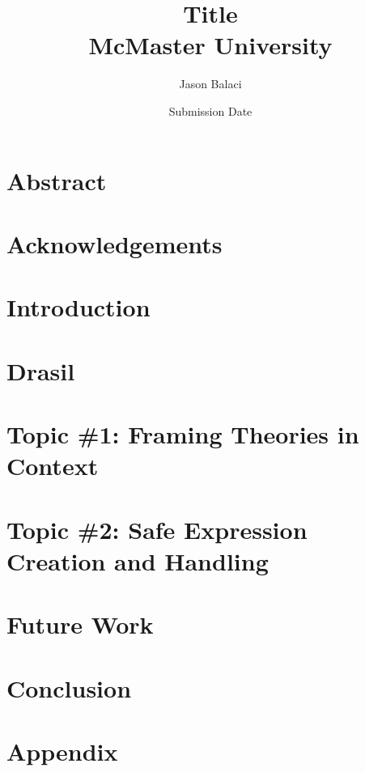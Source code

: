 \documentclass[12pt]{report}
\title{
    {Title}\\
    {McMaster University}
}
\author{Jason Balaci}
\date{Submission Date}
\begin{document}
    \todototoc
    \listoftodos

    \maketitle

    \chapter*{Abstract}
    

    \chapter*{Acknowledgements}
    

    \tableofcontents

    \chapter{Introduction}
    

    \chapter{Drasil}
    
    
    \chapter{Topic \#1: Framing Theories in Context}
    

    \chapter{Topic \#2: Safe Expression Creation and Handling}
    


    \chapter{Future Work}
    
    
    \chapter{Conclusion}
    

    \appendix
    \chapter{Appendix}
    

\end{document}
